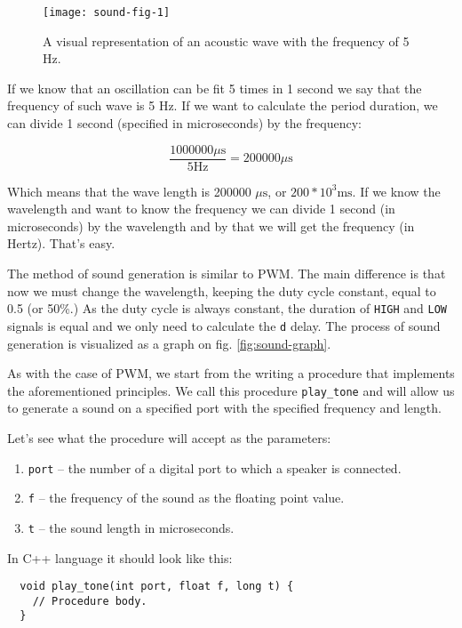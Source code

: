 \documentclass[../sparc.tex]{subfiles}
\begin{document}
\begin{figure}[h]
  \centering
  \texttt{[image: sound-fig-1]}
  \caption{A visual representation of an acoustic wave with the frequency of 5
    Hz.}
  \label{fig:sound-fig-1}
\end{figure}

If we know that an oscillation can be fit 5 times in 1 second we say that the
frequency of such wave is 5 Hz.  If we want to calculate the period duration, we
can divide 1 second (specified in microseconds) by the frequency:

\begin{equation}
  \frac{1000000 \mu\mbox{s}}{5 \mbox{Hz}} = 200000 \mu\mbox{s}
\end{equation}

Which means that the wave length is 200000 $\mu\mbox{s}$, or $ 200 * 10^3
\mbox{ms}$.  If we know the wavelength and want to know the frequency we can
divide 1 second (in microseconds) by the wavelength and by that we will get the
frequency (in Hertz).  That's easy.


The method of sound generation is similar to \gls{PWM}. The main difference is
that now we must change the wavelength, keeping the duty cycle constant, equal
to 0.5 (or 50\%.)  As the duty cycle is always constant, the duration of
\texttt{HIGH} and \texttt{LOW} signals is equal and we only need to calculate
the \texttt{d} delay.  The process of sound generation is visualized as a graph
on fig. \ref{fig:sound-graph}.

As with the case of PWM, we start from the writing a procedure that implements
the aforementioned principles.  We call this procedure \texttt{play\_tone} and
will allow us to generate a sound on a specified port with the specified
frequency and length.

Let's see what the procedure will accept as the parameters:
\begin{enumerate}
\item \texttt{port} -- the number of a digital port to which a speaker is
  connected.
\item \texttt{f} -- the frequency of the sound as the floating point value.
\item \texttt{t} -- the sound length in microseconds.
\end{enumerate}

In C++ language it should look like this:
\begin{verbatim}
  void play_tone(int port, float f, long t) {
    // Procedure body.
  }
\end{verbatim}
\end{document}

